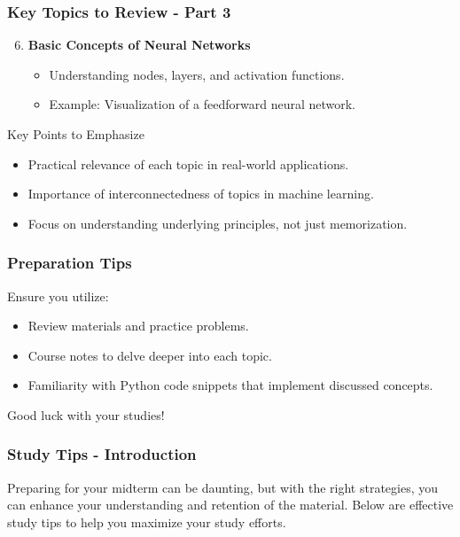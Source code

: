 \documentclass[aspectratio=169]{beamer}
\begin{document}
\begin{frame}[fragile]
    \frametitle{Key Topics to Review - Part 3}
    \begin{enumerate}
        \setcounter{enumi}{5} %
        \item \textbf{Basic Concepts of Neural Networks}
        \begin{itemize}
            \item Understanding nodes, layers, and activation functions.
            \item Example: Visualization of a feedforward neural network.
        \end{itemize}
    \end{enumerate}

    \begin{block}{Key Points to Emphasize}
        \begin{itemize}
            \item Practical relevance of each topic in real-world applications.
            \item Importance of interconnectedness of topics in machine learning.
            \item Focus on understanding underlying principles, not just memorization.
        \end{itemize}
    \end{block}
\end{frame}

\begin{frame}[fragile]
    \frametitle{Preparation Tips}
    Ensure you utilize:
    \begin{itemize}
        \item Review materials and practice problems.
        \item Course notes to delve deeper into each topic.
        \item Familiarity with Python code snippets that implement discussed concepts.
    \end{itemize}
    Good luck with your studies!
\end{frame}

\begin{frame}[fragile]
    \frametitle{Study Tips - Introduction}
    Preparing for your midterm can be daunting, but with the right strategies, you can enhance your understanding and retention of the material. Below are effective study tips to help you maximize your study efforts.
\end{frame}
\end{document}
